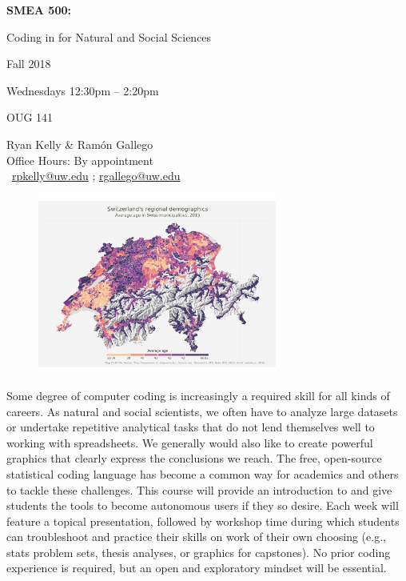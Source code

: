 \documentclass[11pt,letterpaper]{article}
\begin{document}
\begin{center} 
 {\titlefont
		
		\Huge
		\textbf{SMEA 500:}
		
		Coding in \R for Natural and Social Sciences
}

\large
Fall 2018
	
Wednesdays 12:30pm -- 2:20pm

OUG 141

{\titlefont
		Ryan Kelly \& Ramón Gallego\\
		Office Hours: By appointment\\
		\Letter\ \href{mailto:rpkelly@uw.edu}{rpkelly@uw.edu} ; \href{mailto:rgallego@uw.edu}{rgallego@uw.edu}		
}

\end{center}
\setlength{\parskip}{1em}


\begin{figure}[!ht]
\begin{center}
  \includegraphics[width = 0.7\textwidth]{tm-final-map-1.jpg}
\end{center}
\end{figure}



Some degree of computer coding is increasingly a required skill for all kinds of careers. As natural and social scientists, we often have to analyze large datasets or undertake repetitive analytical tasks that do not lend themselves well to working with spreadsheets. We generally would also like to create powerful graphics that clearly express the conclusions we reach. The free, open-source statistical coding language \R has become a common way for academics and others to tackle these challenges. This course will provide an introduction to \R and give students the tools to become autonomous users if they so desire. Each week will feature a topical presentation, followed by workshop time during which students can troubleshoot and practice their skills on work of their own choosing (e.g., stats problem sets, thesis analyses, or graphics for capstones). No prior coding experience is required, but an open and exploratory mindset will be essential. 
\end{document}
